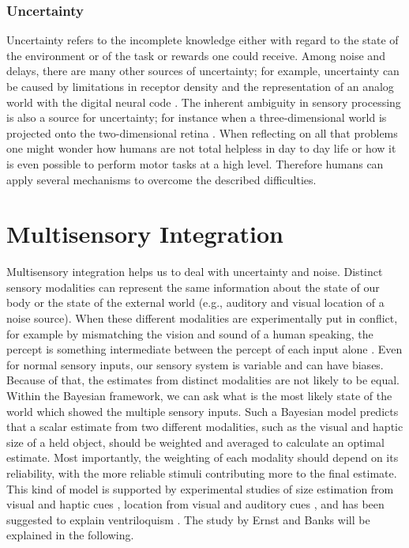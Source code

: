 \documentclass{SeminarV2}
\begin{document}
\subsubsection{Uncertainty}
Uncertainty refers to the incomplete knowledge either with regard to
the state of the environment or of the task or rewards one could receive.
Among noise and delays, there are many other sources of uncertainty;
for example, uncertainty can be caused by limitations in receptor density
and the representation of an analog world with the digital neural
code \cite{franklin2011computational}.  The inherent ambiguity in
sensory processing is also a source for uncertainty; for instance when a
three-dimensional world is projected onto the two-dimensional 
retina \cite{yuille2006vision}.\newline
\newline
When reflecting on all that problems one might wonder how humans are not total helpless in day to day life or how it is even possible to perform motor tasks at a high level. Therefore humans can apply several mechanisms to overcome the described difficulties.


\section{Multisensory Integration}
Multisensory integration helps us to deal with uncertainty
and noise. Distinct sensory modalities can represent the
same information about the state of our body or the state
of the external world (e.g., auditory and visual location of
a noise source). When these different modalities are
experimentally put in conflict, for example by
mismatching the vision and sound of a human speaking,
the percept is something intermediate between the
percept of each input alone \cite{mcgurk1976hearing}. Even for normal sensory inputs, our sensory
system is variable and can have biases. Because of that,
the estimates from distinct modalities are not likely to be
equal. Within the Bayesian framework, we can ask what
is the most likely state of the world which showed the
multiple sensory inputs. Such a Bayesian model predicts
that a scalar estimate from two different modalities, such
as the visual and haptic size of a held object, should be
weighted and averaged to calculate an optimal estimate.
Most importantly, the weighting of each modality
should depend on its reliability, with the more reliable
stimuli contributing more to the final estimate. This kind
of model is supported by experimental studies of size
estimation from visual and haptic cues \cite{ernst2002humans}, location from visual and auditory cues \cite{kording2007causal}, and has been suggested to explain
ventriloquism \cite{alais2004ventriloquist}. The study by Ernst
and Banks will be explained in the following.
\end{document}
